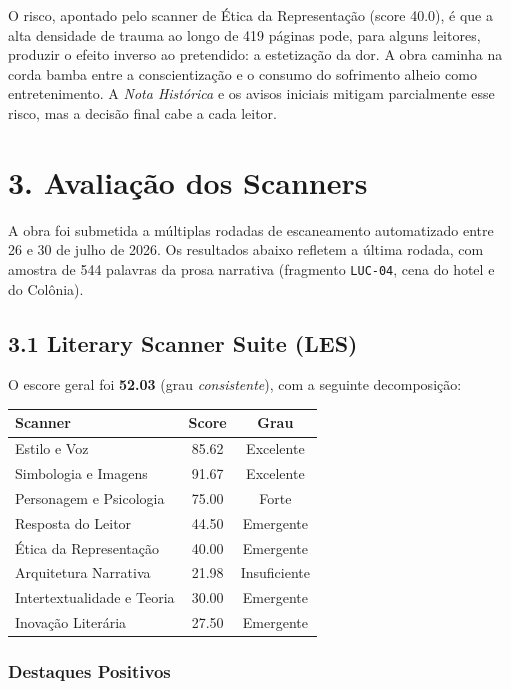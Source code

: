 \documentclass[14pt,openany]{extbook}
\newcommand{\frag}[1]{\texttt{#1}}
\begin{document}
O risco, apontado pelo scanner de Ética da Representação (score 40.0), é que a alta densidade de trauma ao longo de 419 páginas pode, para alguns leitores, produzir o efeito inverso ao pretendido: a estetização da dor. A obra caminha na corda bamba entre a conscientização e o consumo do sofrimento alheio como entretenimento. A \textit{Nota Histórica} e os avisos iniciais mitigam parcialmente esse risco, mas a decisão final cabe a cada leitor.

\chapter*{3. Avaliação dos Scanners}

\noindent A obra foi submetida a múltiplas rodadas de escaneamento automatizado entre 26 e 30 de julho de 2026. Os resultados abaixo refletem a última rodada, com amostra de 544 palavras da prosa narrativa (fragmento \frag{LUC-04}, cena do hotel e do Colônia).

\section*{3.1 Literary Scanner Suite (LES)}

O escore geral foi \textbf{52.03} (grau \textit{consistente}), com a seguinte decomposição:

\begin{longtable}{lcc}
\toprule
\textbf{Scanner} & \textbf{Score} & \textbf{Grau} \\
\midrule
\endhead
Estilo e Voz & 85.62 & Excelente \\
Simbologia e Imagens & 91.67 & Excelente \\
Personagem e Psicologia & 75.00 & Forte \\
Resposta do Leitor & 44.50 & Emergente \\
Ética da Representação & 40.00 & Emergente \\
Arquitetura Narrativa & 21.98 & Insuficiente \\
Intertextualidade e Teoria & 30.00 & Emergente \\
Inovação Literária & 27.50 & Emergente \\
\bottomrule
\end{longtable}

\subsection*{Destaques Positivos}
\end{document}
